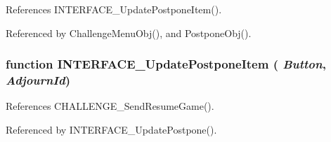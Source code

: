 References INTERFACE\_\-UpdatePostponeItem().

Referenced by ChallengeMenuObj(), and PostponeObj().
\subsubsection[INTERFACE\_\-UpdatePostponeItem]{\setlength{\rightskip}{0pt plus 5cm}function INTERFACE\_\-UpdatePostponeItem ( {\em Button}, \/   {\em AdjournId})}\label{challengemenu_8js_2b0af42ae7bd7b60587660c3a652e504}




References CHALLENGE\_\-SendResumeGame().

Referenced by INTERFACE\_\-UpdatePostpone().